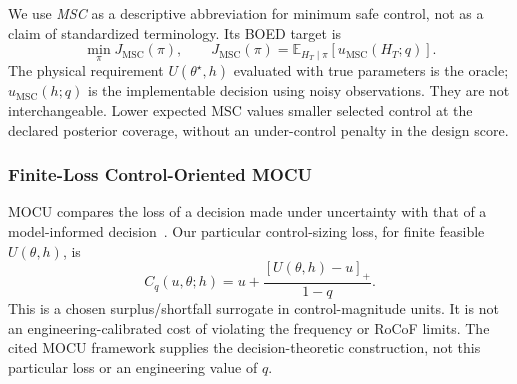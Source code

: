 \documentclass[journal]{IEEEtran}
\newcommand{\E}{\mathbb E}
\begin{document}
We use \emph{MSC} as a descriptive abbreviation for minimum safe control,
not as a claim of standardized terminology. Its BOED target is
\begin{equation}
\min_\pi J_{\mathrm{MSC}}(\pi),\qquad
J_{\mathrm{MSC}}(\pi)=\E_{H_T\mid\pi}[u_{\mathrm{MSC}}(H_T;q)].
\label{eq:msc-objective}
\end{equation}
The physical requirement $U(\theta^\star,h)$ evaluated with true parameters
is the oracle; $u_{\mathrm{MSC}}(h;q)$ is the implementable decision using
noisy observations. They are not interchangeable. Lower expected MSC values
smaller selected control at the declared posterior coverage, without an
under-control penalty in the design score.

\subsubsection{Finite-Loss Control-Oriented MOCU}
MOCU compares the loss of a decision made under uncertainty with that of a
model-informed decision~\cite{yoon2013mocu,boluki2018generalized}.
Our particular control-sizing loss, for finite feasible $U(\theta,h)$, is
\begin{equation}
C_q(u,\theta;h)=u+\frac{[U(\theta,h)-u]_+}{1-q}.
\label{eq:operational_cost}
\end{equation}
This is a chosen surplus/shortfall surrogate in control-magnitude units.
It is not an engineering-calibrated cost of violating the frequency or RoCoF
limits. The cited MOCU framework supplies the decision-theoretic construction,
not this particular loss or an engineering value of $q$.
\end{document}
